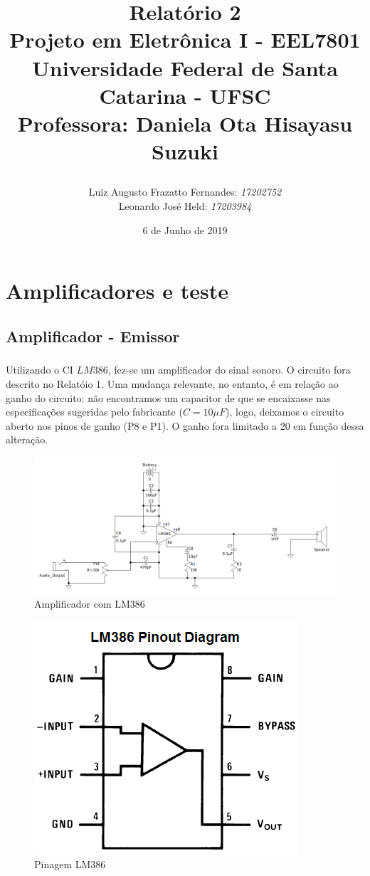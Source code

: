 \documentclass[12pt,a4paper]{report}
\title{Relatório 2  \\
	Projeto em Eletrônica I - EEL7801 \\ \vfill
	\normalsize{Universidade Federal de Santa Catarina - UFSC \\
		Professora: Daniela Ota Hisayasu Suzuki}
	\author{
		{Luiz Augusto Frazatto Fernandes: \it{17202752}} \\
		{Leonardo José Held: \it{17203984}}
	}
}
\date{6 de Junho de 2019}
\begin{document}
	\maketitle
	\setcounter{chapter}{0}
	\chapter{Amplificadores e teste}
	\section{Amplificador - Emissor}
		\paragraph{} Utilizando o CI $LM386$, fez-se um amplificador do sinal sonoro. O circuito fora descrito no Relatóio 1. Uma mudança relevante, no entanto, é em relação ao ganho do circuito: não encontramos um capacitor de que se encaixasse nas especificações sugeridas pelo fabricante ($C = 10\mu{F}$), logo, deixamos o circuito aberto nos pinos de ganho (P8 e P1). O ganho fora limitado a 20 em função dessa alteração.\\
		
		\begin{figure}[h]
			\centering
			\includegraphics[width=\linewidth]{corrected_amplifier.png}
			\caption{Amplificador com LM386}
			\label{fig:amplifier386}
		\end{figure}
		
		
		\begin{figure}[h]
			\centering
			\includegraphics[width=.3\linewidth]{LM386_pinout_diagram.png}
			\caption{Pinagem LM386}
			\label{fig:pinout386}
		\end{figure}
		
\end{document}
